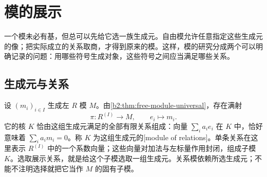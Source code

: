 
\section{模的展示}
\label{b2:sec:0302}

一个模未必有基，但总可以先给它选一族生成元。自由模允许任意指定这些生成元的像；把实际成立的关系取商，才得到原来的模。这样，模的研究分成两个可以明确记录的问题：用哪些符号生成对象，这些符号之间应当满足哪些关系。

%
%

\subsection{生成元与关系}
\label{b2:subsec:0302:01}

设 \((m_i)_{i\in I}\) 生成左 \(R\) 模 \(M\)。由\cref{b2:thm:free-module-universal}，存在满射
\[
	\pi:R^{(I)}\longrightarrow M,\qquad e_i\longmapsto m_i.
\]
它的核 \(K\) 恰由这组生成元满足的全部有限关系组成：向量 \(\sum_i a_i e_i\) 在 \(K\) 中，恰好意味着 \(\sum_i a_i m_i=0\)。称 \(K\) 为这组生成元的[module of relations]。单条关系在这里表示 \(R^{(I)}\) 中的一个系数向量；这些向量对加法与左标量作用封闭，组成子模 \(K\)。选取展示关系，就是给这个子模选取一组生成元。关系模依赖所选生成元；不能不注明选择就把它当作 \(M\) 的固有子模。


